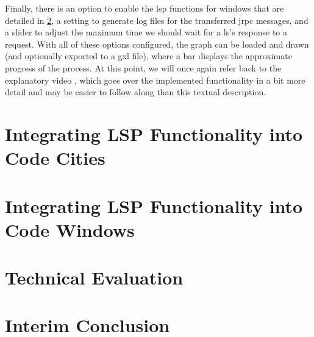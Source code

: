 \documentclass[../thesis]{subfiles}
\begin{document}
Finally, there is an option to enable the \gls{lsp} functions for \glspl{window} that are detailed in \cref{sec:intowindow}, a setting to generate log files for the transferred \gls{jrpc} messages, and a slider to adjust the maximum time we should wait for a \gls{ls}'s response to a request.
With all of these options configured, the graph can be loaded and drawn (and optionally exported to a \gls{gxl} file), where a bar displays the approximate progress of the process.
At this point, we will once again refer back to the explanatory video , which goes over the implemented functionality in a bit more detail and may be easier to follow along than this textual description.

\section{Integrating LSP Functionality into Code Cities}\label{sec:intocity}
\fxfatal{}


\section{Integrating LSP Functionality into Code Windows}\label{sec:intowindow}
\fxfatal{}

\section{Technical Evaluation}\label{sec:techeval}
\fxfatal{}


\section{Interim Conclusion}\label{sec:implconclusion}
\fxfatal{}


\end{document}
